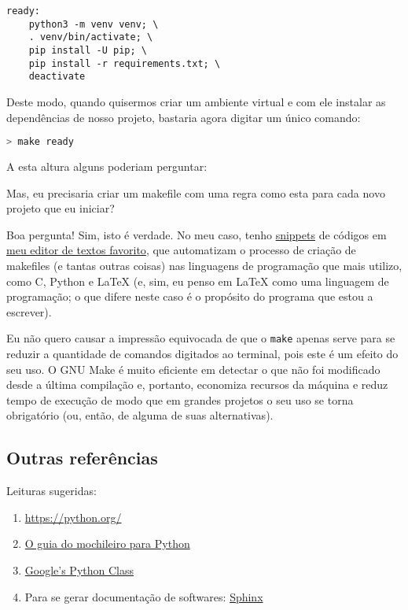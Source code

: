 \begin{lstlisting}[caption={Exemplo de makefile}]
  ready:
    python3 -m venv venv; \
    . venv/bin/activate; \
    pip install -U pip; \
    pip install -r requirements.txt; \
    deactivate
\end{lstlisting}

Deste modo, quando quisermos criar um ambiente virtual e com ele instalar as
dependências de nosso projeto, bastaria agora digitar um único comando:

\begin{lstlisting}[language=bash,caption={Reduzindo-se a quantidade de comandos digitados}]
  > make ready
\end{lstlisting}

A esta altura alguns poderiam perguntar:

Mas, eu precisaria criar um makefile com uma regra como esta para cada novo
projeto que eu iniciar?

Boa pergunta! Sim, isto é verdade. No meu caso, tenho
\href{https://github.com/SirVer/ultisnips}{snippets} de códigos em
\href{https://www.vim.org/}{meu editor de textos favorito}, que automatizam o
processo de criação de makefiles (e tantas outras coisas) nas linguagens de
programação que mais utilizo, como C, Python e \LaTeX{} (e, sim, eu penso em
\LaTeX{} como uma linguagem de programação; o que difere neste caso é o
propósito do programa que estou a escrever).

Eu não quero causar a impressão equivocada de que o \texttt{make} apenas serve
para se reduzir a quantidade de comandos digitados ao terminal, pois este é um
efeito do seu uso. O GNU Make é muito eficiente em detectar o que não foi
modificado desde a última compilação e, portanto, economiza recursos da máquina
e reduz tempo de execução de modo que em grandes projetos o seu uso se torna
obrigatório (ou, então, de alguma de suas alternativas).

\subsection{Outras referências}\label{ssec:outras-referências}

Leituras sugeridas:

\begin{enumerate}
  \item
    \href{https://python.org/}{https://python.org/}
  \item
    \href{https://docs.python-guide.org/}{O guia do mochileiro para Python}
  \item
    \href{https://developers.google.com/edu/python/}{Google's Python Class}
  \item
    Para se gerar documentação de softwares:
    \href{https://docs.readthedocs.io/en/stable/intro/getting-started-with-sphinx.html}{Sphinx}
\end{enumerate}
